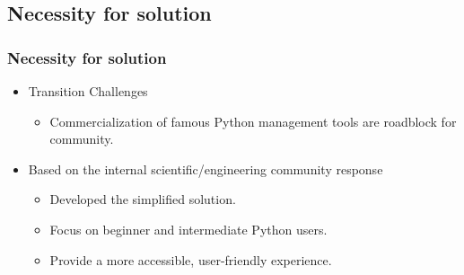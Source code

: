 \documentclass[t]{beamer}
\begin{document}
\begin{frame}
	\end{frame}
	
	
	\subsection{Necessity for solution}
	\begin{frame}
		\frametitle{Necessity for solution}
		\vspace{-9pt}
		\begin{center}
			\vspace{20pt} %
			\small
			\begin{itemize}
				\item Transition Challenges
				\begin{itemize}
					\item Commercialization of famous Python management tools are roadblock for community.
				\end{itemize}
			\end{itemize}
			\vspace{2pt}
			\begin{itemize}
				\item Based on the internal scientific/engineering community response
				\begin{itemize}
					\item Developed the simplified solution.
					\item Focus on beginner and intermediate Python users.
					\item Provide a more accessible, user-friendly experience.
				\end{itemize}
			\end{itemize}
		\end{center}
	\end{frame}
	
	
	
\end{document}

